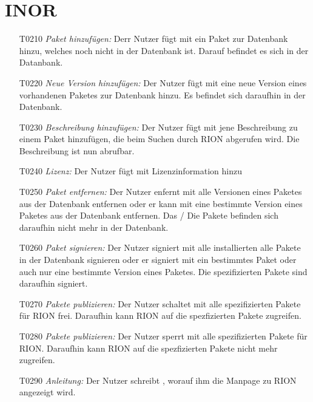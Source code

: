 \section{INOR}

\begin{itemize}
	\item[T0210] \textit{Paket hinzufügen:} Derr Nutzer fügt mit  ein Paket zur Datenbank hinzu, welches noch nicht in der Datenbank ist. Darauf befindet es sich in der Datanbank.
	\item[T0220] \textit{Neue Version hinzufügen:} Der Nutzer fügt mit  eine neue Version eines vorhandenen Paketes zur Datenbank hinzu. Es befindet sich daraufhin in der Datenbank.
	\item[T0230] \textit{Beschreibung hinzufügen:} Der Nutzer fügt mit  jene Beschreibung zu einem Paket hinzufügen, die beim Suchen durch RION abgerufen wird. Die Beschreibung ist nun abrufbar.
	\item[T0240] \textit{Lizenz:} Der Nutzer fügt mit  Lizenzinformation hinzu
	\item[T0250] \textit{Paket entfernen:} Der Nutzer enfernt mit  alle Versionen eines Paketes aus der Datenbank entfernen oder er kann mit  eine bestimmte Version eines Paketes aus der Datenbank entfernen. Das / Die Pakete befinden sich daraufhin nicht mehr in der Datenbank.
	\item[T0260] \textit{Paket signieren:} Der Nutzer signiert mit  alle installierten alle Pakete in der Datenbank signieren oder er signiert mit  ein bestimmtes Paket oder auch nur eine bestimmte Version eines Paketes. Die spezifizierten Pakete sind daraufhin signiert.
	\item[T0270] \textit{Pakete publizieren:} Der Nutzer schaltet mit  alle spezifizierten Pakete für RION frei. Daraufhin kann RION auf die spezfizierten Pakete zugreifen.
	\item[T0280] \textit{Pakete publizieren:} Der Nutzer sperrt mit  alle spezifizierten Pakete für RION. Daraufhin kann RION auf die spezfizierten Pakete nicht mehr zugreifen.
	\item[T0290] \textit{Anleitung:} Der Nutzer schreibt , worauf ihm die Manpage zu RION angezeigt wird.
\end{itemize}

